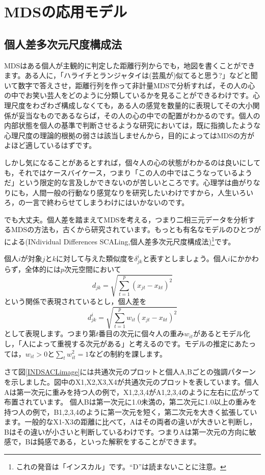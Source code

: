 \documentclass{ltjsbook}
\begin{document}
\section{MDSの応用モデル}
\subsection{個人差多次元尺度構成法}
MDSはある個人が主観的に判定した距離行列からでも，地図を書くことができます。ある人に，「ハライチとランジャタイは(芸風が)似てると思う?」などと聞いて数字で答えさせ，距離行列を作って非計量MDSで分析すれば，その人の心の中でお笑い芸人をどのように分類しているかを見ることができるわけです。心理尺度をわざわざ構成しなくても，ある人の感覚を数量的に表現してその大小関係が妥当なものであるならば，その人の心の中での配置がわかるのです。個人の内部状態を個人の基準で判断させるような研究においては，既に指摘したような心理尺度の理論的根拠の弱さは該当しませんから，目的によってはMDSの方がよほど適しているはずです。

しかし気になることがあるとすれば，個々人の心の状態がわかるのは良いにしても，それではケースバイケース，つまり「この人の中ではこうなっているようだ」という限定的な言及しかできないのが苦しいところです。心理学は曲がりなりにも，人間一般の行動なり感覚なりを研究したいわけですから，人生いろいろ，の一言で終わらせてしまうわけにはいかないのです。

でも大丈夫。個人差を踏まえてMDSを考える，つまり二相三元データを分析するMDSの方法も，古くから研究されています。もっとも有名なモデルのひとつが\citet{carroll1970analysis}による(INdividual Differences SCALing,個人差多次元尺度構成法)\footnote{これの発音は「インスカル」です。``D''は読まないことに注意。}です。

個人$i$が対象$j$と$k$に対して与えた類似度を$\delta_{jk}^i$と表すとしましょう。個人$i$にかかわらず，全体的には$p$次元空間において
\[ d_{jk} = \sqrt{\sum_{t=1}^p (x_{jt}-x_{kt})^2} \]
という関係で表現されているとし，個人差を
\[ d_{jk}^i = \sqrt{\sum_{t=1}^p w_{it}(x_{jt}-x_{kt})^2} \]
として表現します。つまり第$t$番目の次元に個々人の重み$w_{it}$があるとモデル化し，「人によって重視する次元がある」と考えるのです。モデルの推定にあたっては，$w_{it}\gt 0$と$\sum_t w_{it}^2=1$などの制約を課します。

さて図\ref{INDSACLimage}には共通次元のプロットと個人A,Bごとの強調パターンを示しました。図中のX1,X2,X3,X4が共通次元のプロットを表しています。個人Aは第一次元に重みを持つ人の例で，X1,2,3,4がA1,2,3,4のように左右に広がって布置されています。
個人Bは第一次元に1.0未満の，第二次元に1.0以上の重みを持つ人の例で，B1,2,3,4のように第一次元を短く，第二次元を大きく拡張しています。一般的なX1-X3の距離に比べて，Aはその両者の違いが大きいと判断し，Bはその違いが小さいと判断しているわけです。つまりAは第一次元の方向に敏感で，Bは鈍感である，といった解釈をすることができます。
\end{document}
